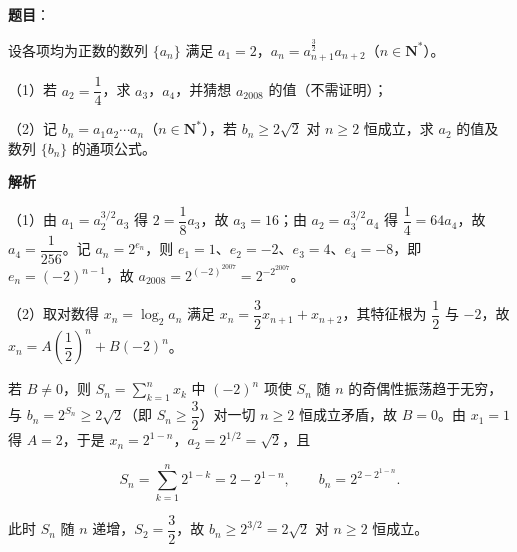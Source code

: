 \begin{answer}

\textbf{题目}：

设各项均为正数的数列 $\{a_n\}$ 满足 $a_1=2$，$a_n=a_{n+1}^{\frac32}a_{n+2}$（$n\in\mathbf N^*$）。

（1）若 $a_2=\dfrac14$，求 $a_3$，$a_4$，并猜想 $a_{2008}$ 的值（不需证明）；

（2）记 $b_n=a_1a_2\cdots a_n$（$n\in\mathbf N^*$），若 $b_n\geqslant2\sqrt2$ 对 $n\geqslant2$ 恒成立，求 $a_2$ 的值及数列 $\{b_n\}$ 的通项公式。

\textbf{解析}

（1）由 $a_1=a_2^{3/2}a_3$ 得 $2=\dfrac18a_3$，故 $a_3=16$；由 $a_2=a_3^{3/2}a_4$ 得 $\dfrac14=64a_4$，故 $a_4=\dfrac1{256}$。记 $a_n=2^{e_n}$，则 $e_1=1$、$e_2=-2$、$e_3=4$、$e_4=-8$，即 $e_n=(-2)^{n-1}$，故 $a_{2008}=2^{(-2)^{2007}}=2^{-2^{2007}}$。

（2）取对数得 $x_n=\log_2a_n$ 满足 $x_n=\dfrac32x_{n+1}+x_{n+2}$，其特征根为 $\dfrac12$ 与 $-2$，故 $x_n=A\left(\dfrac12\right)^n+B(-2)^n$。

若 $B\neq0$，则 $S_n=\sum\limits_{k=1}^nx_k$ 中 $(-2)^n$ 项使 $S_n$ 随 $n$ 的奇偶性振荡趋于无穷，与 $b_n=2^{S_n}\geqslant2\sqrt2$（即 $S_n\geqslant\dfrac32$）对一切 $n\geqslant2$ 恒成立矛盾，故 $B=0$。由 $x_1=1$ 得 $A=2$，于是 $x_n=2^{1-n}$，$a_2=2^{1/2}=\sqrt2$，且

\nopagebreak[4]
\[S_n=\sum_{k=1}^n2^{1-k}=2-2^{1-n},\qquad b_n=2^{2-2^{1-n}}.\]

此时 $S_n$ 随 $n$ 递增，$S_2=\dfrac32$，故 $b_n\geqslant2^{3/2}=2\sqrt2$ 对 $n\geqslant2$ 恒成立。


\end{answer}
